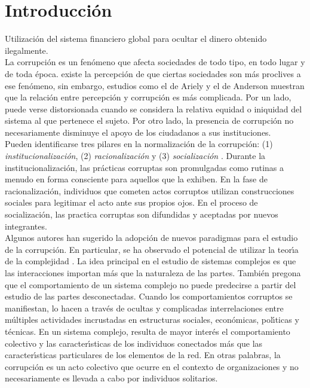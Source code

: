 \chapter{Introducci\'{o}n}



Utilizaci\'{o}n del sistema financiero global para ocultar el dinero obtenido ilegalmente. \cite{granados2022geometry}\\

La corrupci\'{o}n es un fen\'{o}meno que afecta sociedades de todo tipo, en todo lugar y de toda \'{e}poca. existe la percepci\'{o}n de que ciertas sociedades son m\'{a}s proclives a ese fen\'{o}meno, sin embargo, estudios como el de Ariely  \cite{ariely2017corruption} y el de Anderson \cite{anderson2003corruption} muestran que la relaci\'{o}n entre percepci\'{o}n y corrupci\'{o}n es m\'{a}s complicada. Por un lado, puede verse distorsionada cuando se considera la relativa equidad o iniquidad del sistema al que pertenece el sujeto. Por otro lado, la presencia de corrupci\'{o}n no necesariamente disminuye el apoyo de los ciudadanos a sus instituciones.\\

Pueden identificarse tres pilares en la normalizaci\'{o}n de la corrupci\'{o}n: (1) {\it institucionalizaci\'{o}n}, (2) {\it racionalizaci\'{o}n} y (3) {\it socializaci\'{o}n} \cite{ashforth2003normalization}. Durante la institucionalizaci\'{o}n, las pr\'{a}cticas corruptas son promulgadas como rutinas a menudo en forma consciente para aquellos que la exhiben. En la fase de racionalizaci\'{o}n, individuos que cometen actos corruptos utilizan construcciones sociales para legitimar el acto ante sus propios ojos. En el proceso de socializaci\'{o}n, las practica corruptas son difundidas y aceptadas por nuevos integrantes.\\

Algunos autores han sugerido la adopci\'{o}n de nuevos paradigmas para el estudio de la corrupci\'{o}n. En particular, se ha observado el potencial de utilizar la teor\'{\i}a de la complejidad \cite{nicolas2021corruptomics}.  La idea principal en el estudio de sistemas complejos es que las interacciones importan m\'{a}s que la naturaleza de las partes. Tambi\'{e}n pregona que el comportamiento de un sistema complejo no puede predecirse a partir del estudio de las partes desconectadas. Cuando los comportamientos corruptos se manifiestan, lo hacen a trav\'{e}s de ocultas y complicadas interrelaciones entre m\'{u}ltiples actividades incrustadas en estructuras sociales, econ\'{o}micas, pol\'{\i}ticas y t\'{e}cnicas. En un sistema complejo, resulta de mayor inter\'{e}s el comportamiento colectivo y las caracter\'{\i}sticas de los individuos conectados m\'{a}s que las caracter\'{\i}sticas particulares de los elementos de la red. En otras palabras, la corrupci\'{o}n es un acto colectivo que ocurre en el contexto de organizaciones \cite{ashforth2003normalization} y no necesariamente es llevada a cabo por individuos solitarios.\\


